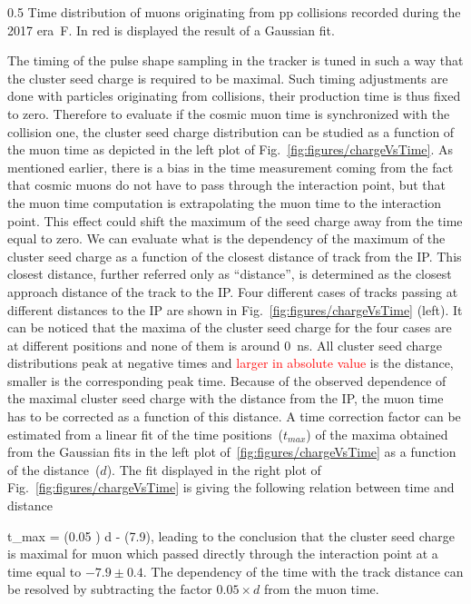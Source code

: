                  {0.5}       %
                 { Time distribution of muons originating from pp collisions recorded during the 2017 era~F. In red is displayed the result of a Gaussian fit.  }


The timing of the pulse shape sampling in the tracker is tuned in such a way that the cluster seed charge is required to be maximal. Such timing adjustments are done with particles originating from collisions, their production time is thus fixed to zero. Therefore to evaluate if the cosmic muon time is synchronized with the collision one, the cluster seed charge distribution can be studied as a function of the muon time as depicted in the left plot of Fig.~\ref{fig:figures/chargeVsTime}. As mentioned earlier, there is a bias in the time measurement coming from the fact that cosmic muons do not have to pass through the interaction point, but that the muon time computation is extrapolating the muon time to the interaction point. This effect could shift the maximum of the seed charge away from the time equal to zero. We can evaluate what is the dependency of the maximum of the cluster seed charge as a function of the closest distance of track from the IP. This closest distance, further referred only as ``distance'', is determined as the closest approach distance of the track to the IP. Four different cases of tracks passing at different distances to the IP are shown in Fig.~\ref{fig:figures/chargeVsTime} (left).  It can be noticed that the maxima of the cluster seed charge for the four cases are at different positions and none of them is around 0~ns. All cluster seed charge distributions peak at negative times and \textcolor{red}{larger in absolute value} is the distance, smaller is the corresponding peak time. Because of the observed dependence of the maximal cluster seed charge with the distance from the IP, the muon time has to be corrected as a function of this distance. A time correction factor can be estimated from a linear fit of the time positions~($t_{max}$) of the maxima obtained from the Gaussian fits in the left plot of~\ref{fig:figures/chargeVsTime} as a function of the distance~($d$). The fit displayed in the right plot of Fig.~\ref{fig:figures/chargeVsTime} is giving the following relation between time and distance

{
t_{max} = (0.05 ) \times d  - (7.9),
}
leading to the conclusion that the cluster seed charge is maximal for muon which passed directly through the interaction point at a time equal to $-7.9 \pm 0.4 $. The dependency of the time with the track distance can be resolved by subtracting the factor $ 0.05 \times d $ from the muon time.


